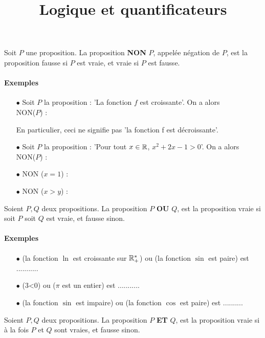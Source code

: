 \documentclass[a4paper, 11pt]{article}
\begin{document}
\title{Logique et quantificateurs}





\begin{defi}
Soit $P$ une proposition. La proposition \textbf{NON} $P$, appelée négation de $P$, est la proposition fausse si $P$ est vraie, et vraie si $P$ est fausse. 
\end{defi}
\paragraph{Exemples}
\begin{itemize}
\item[$\bullet$] Soit $P$  la proposition : 'La fonction $f$ est croissante'. On a alors\\
NON($P$) : 

En particulier, ceci ne signifie pas 'la fonction f est décroissante'.
\item[$\bullet$]  Soit $P$  la proposition : 'Pour tout $x\in \mathbb{R}$, $x^2+2x-1>0$'. On a alors \\
NON($P$) :


\item[$\bullet$] NON ($x=1$) :  
\item[$\bullet$] NON ($x>y$) : 
\end{itemize}


\begin{defi}
Soient $P, Q$ deux propositions. La proposition $P$ \textbf{OU} $Q$, est la proposition vraie si soit $P$ soit $Q$  est vraie, et fausse sinon.
\end{defi}
\paragraph{Exemples}
\begin{itemize}
\item[$\bullet$] (la fonction $\ln{}$ est croissante sur $\mathbb{R}_+^*$) ou (la fonction $\sin{}$ est paire) est ...........
\item[$\bullet$] (3<0) ou ($\pi$ est un entier) est  ...........
\item[$\bullet$] (la fonction $\sin{}$ est impaire) ou (la fonction $\cos{}$ est paire) est  ..........
\end{itemize}


\begin{defi}
Soient $P, Q$ deux propositions. La proposition $P$ \textbf{ET} $Q$, est la proposition vraie si à la fois  $P$ et $Q$  sont vraies, et fausse sinon.
\end{defi}
\end{document}
